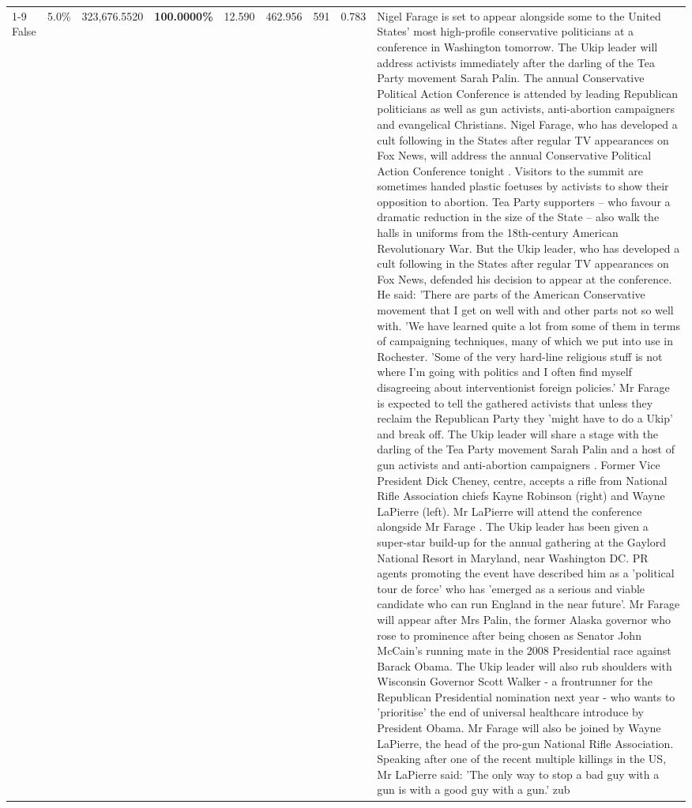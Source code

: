 \begin{table}[H]
\begin{tabular}{lllrlllll}
\cline{1-9}
False & 5.0\% & 323,676.5520 & \bfseries \color{red} 100.0000\% & 12.590 & 462.956 & 591 & 0.783 & Nigel Farage is set to appear alongside some to the United States' most high-profile conservative politicians at a conference in Washington tomorrow. The Ukip leader will address activists immediately after the darling of the Tea Party movement Sarah Palin. The annual Conservative Political Action Conference is attended by leading Republican politicians as well as gun activists, anti-abortion campaigners and evangelical Christians. Nigel Farage, who has developed a cult following in the States after regular TV appearances on Fox News, will address the annual Conservative Political Action Conference tonight . Visitors to the summit are sometimes handed plastic foetuses by activists to show their opposition to abortion. Tea Party supporters – who favour a dramatic reduction in the size of the State – also walk the halls in uniforms from the 18th-century American Revolutionary War. But the Ukip leader, who has developed a cult following in the States after regular TV appearances on Fox News, defended his decision to appear at the conference. He said: 'There are parts of the American Conservative movement that I get on well with and other parts not so well with. 'We have learned quite a lot from some of them in terms of campaigning techniques, many of which we put into use in Rochester. 'Some of the very hard-line religious stuff is not where I'm going with politics and I often find myself disagreeing about interventionist foreign policies.' Mr Farage is expected to tell the gathered activists that unless they reclaim the Republican Party they 'might have to do a Ukip' and break off. The Ukip leader will share a stage with the darling of the Tea Party movement Sarah Palin and a host of gun activists and anti-abortion campaigners . Former Vice President Dick Cheney, centre, accepts a rifle from National Rifle Association chiefs Kayne Robinson (right) and Wayne LaPierre (left). Mr LaPierre will attend the conference alongside Mr Farage . The Ukip leader has been given a super-star build-up for the annual gathering at the Gaylord National Resort in Maryland, near Washington DC. PR agents promoting the event have described him as a 'political tour de force' who has 'emerged as a serious and viable candidate who can run England in the near future'. Mr Farage will appear after Mrs Palin, the former Alaska governor who rose to prominence after being chosen as Senator John McCain's running mate in the 2008 Presidential race against Barack Obama. The Ukip leader will also rub shoulders with Wisconsin Governor Scott Walker - a frontrunner for the Republican Presidential nomination next year - who wants to 'prioritise' the end of universal healthcare introduce by President Obama. Mr Farage will also be joined by Wayne LaPierre, the head of the pro-gun National Rifle Association. Speaking after one of the recent multiple killings in the US, Mr LaPierre said: 'The only way to stop a bad guy with a gun is with a good guy with a gun.' zub \\

\end{tabular}
\end{table}
